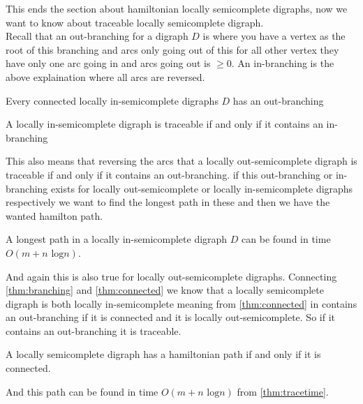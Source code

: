 This ends the section about hamiltonian locally semicomplete digraphs, now we want to know about traceable locally semicomplete digraph. \\
Recall that an out-branching for a digraph $D$ is where you have a vertex as the root of this branching and arcs only going out of this for all other vertex they have only one arc going in and arcs going out is $\geq 0$. 
An in-branching is the above explaination where all arcs are reversed.
\begin{thm}
    Every connected locally in-semicomplete digraphs $D$ has an out-branching
    \label{thm:connected}
\end{thm}
\begin{thm}
    A locally in-semicomplete digraph is traceable if and only if it contains an in-branching
    \label{thm:branching}
\end{thm}
This also means that reversing the arcs that a locally out-semicomplete digraph is traceable if and only if it contains an out-branching. 
if this out-branching or in-branching exists for locally out-semicomplete or locally in-semicomplete digraphs respectively we want to find the longest path in these and then we have the wanted hamilton path.
\begin{thm}
    A longest path in a locally in-semicomplete digraph $D$ can be found in time $O(m+n\text{ log}n)$. 
    \label{thm:tracetime}
\end{thm}
And again this is also true for locally out-semicomplete digraphs.
Connecting \autoref{thm:branching} and \autoref{thm:connected} we know that a locally semicomplete digraph is both locally in-semicomplete meaning from \autoref{thm:connected} in contains an out-branching if it is connected and it is locally out-semicomplete. So if it contains an out-branching it is traceable. 
\begin{thm}
    A locally semicomplete digraph has a hamiltonian path if and only if it is connected.
\end{thm}
And this path can be found in time $O(m+n\text{ log}n)$ from \autoref{thm:tracetime}.


